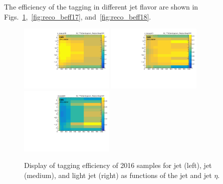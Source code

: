 The efficiency of the \PQb tagging in different jet flavor are shown in Figs.~\ref{fig:reco_beff16},~\ref{fig:reco_beff17}, and~\ref{fig:reco_beff18}. 
\begin{figure}\centering
    \includegraphics[width=0.4\textwidth]{figure/BtagEffPlot_16_TTToSemiLeptonic_eff2D_b_MediumDeepCSV.pdf}
    \includegraphics[width=0.4\textwidth]{figure/BtagEffPlot_16_TTToSemiLeptonic_eff2D_c_MediumDeepCSV.pdf}
    \includegraphics[width=0.4\textwidth]{figure/BtagEffPlot_16_TTToSemiLeptonic_eff2D_l_MediumDeepCSV.pdf}
    \caption[Display of \PQb tagging efficiency of 2016 \ttbar samples.]
    {
        Display of \PQb tagging efficiency of 2016 \ttbar samples for \PQb jet (left), \PQc jet (medium), and light jet (right) as functions of the jet \PT and jet $\eta$.
    }
    \label{fig:reco_beff16}
\end{figure}
